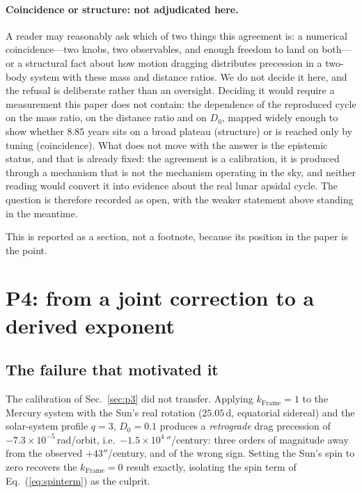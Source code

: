 \documentclass[aps,reprint,amsmath,amssymb,nofootinbib,superscriptaddress,floatfix]{revtex4-2}
\begin{document}
\paragraph*{Coincidence or structure: not adjudicated here.}
A reader may reasonably ask which of two things this agreement is: a
numerical coincidence---two knobs, two observables, and enough freedom
to land on both---or a structural fact about how motion dragging
distributes precession in a two-body system with these mass and
distance ratios.
We do not decide it here, and the refusal is deliberate rather than an
oversight.
Deciding it would require a measurement this paper does not contain:
the dependence of the reproduced cycle on the mass ratio, on the
distance ratio and on $D_0$, mapped widely enough to show whether
$8.85$ years sits on a broad plateau (structure) or is reached only by
tuning (coincidence).
What does not move with the answer is the epistemic status, and that is
already fixed: the agreement is a calibration, it is produced through a
mechanism that is not the mechanism operating in the sky, and neither
reading would convert it into evidence about the real lunar apsidal
cycle.
The question is therefore recorded as open, with the weaker statement
above standing in the meantime.

This is reported as a section, not a footnote, because its position in
the paper is the point.

\section{P4: from a joint correction to a derived exponent}
\label{sec:p4}

\subsection{The failure that motivated it}
\label{sec:p4fail}

The calibration of Sec.~\ref{sec:p3} did not transfer.
Applying $k_{\mathrm{Frame}}=1$ to the Mercury system with the Sun's
real rotation ($25.05$\,d, equatorial sidereal) and the solar-system
profile $q=3$,
$D_0=0.1$ produces a \emph{retrograde} drag precession of
$-7.3\times10^{-5}$\,rad/orbit, i.e.\ $-1.5\times10^{4}\,''$/century:
three orders of magnitude away from the observed $+43''$/century, and
of the wrong sign.
Setting the Sun's spin to zero recovers the $k_{\mathrm{Frame}}=0$
result exactly, isolating the spin term of Eq.~(\ref{eq:spinterm}) as
the culprit.
\end{document}
